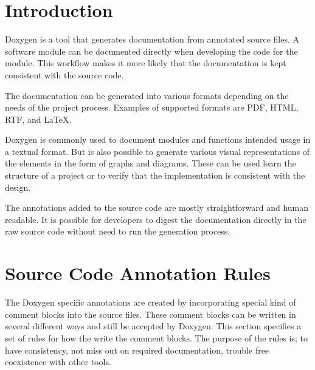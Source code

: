 
\section*{Introduction}

Doxygen is a tool that generates documentation from annotated source files. A software module can be documented directly when developing the code for the module. This workflow makes it more likely that the documentation is kept consistent with the source code.

The documentation can be generated into various formats depending on the needs of the project process. Examples of supported formats are PDF, HTML, RTF, and \LaTeX{}.

Doxygen is commonly used to document modules and functions intended usage in a textual format. But is also possible to generate various visual representations of the elements in the form of graphs and diagrams. These can be used learn the structure of a project or to verify that the implementation is consistent with the design.

The annotations added to the source code are mostly straightforward and human readable. It is possible for developers to digest the documentation directly in the raw source code without need to run the generation process.

\section*{Source Code Annotation Rules}

The Doxygen specific annotations are created by incorporating special kind of comment blocks into the source files. These comment blocks can be written in several different ways and still be accepted by Doxygen. This section specifies a set of rules for how the write the comment blocks. The purpose of the rules is; to have consistency, not miss out on required documentation, trouble free coexistence with other tools.









